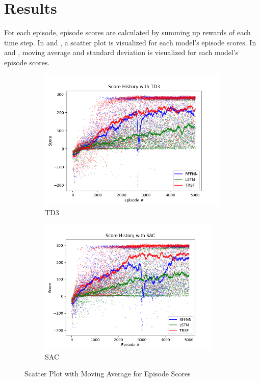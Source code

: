 \section{Results}

For each episode, episode scores are calculated by summing up rewards of each time step. 
In  and , a scatter plot is visualized for each model's episode scores. 
In  and , moving average and standard deviation is visualized for each model's episode scores. 

\begin{figure}[!ht]
	\centering
	\begin{subfigure}{.49\textwidth}
		\centering
		\includegraphics[width=0.99\textwidth]{figures/bipedal/SCATTER_TD3_RFFNN_LSTM_TRSF.png}
		\caption{TD3}
		\label{fig:td3_scatter_ep_rewards}
	\end{subfigure}
	\begin{subfigure}{.49\textwidth}
		\centering
		\includegraphics[width=0.95\textwidth]{figures/bipedal/SCATTER_SAC_RFFNN_LSTM_TRSF.png}
		\caption{SAC}
		\label{fig:sac_scatter_ep_rewards}
	\end{subfigure}
	\caption{Scatter Plot with Moving Average for Episode Scores}
\end{figure}

